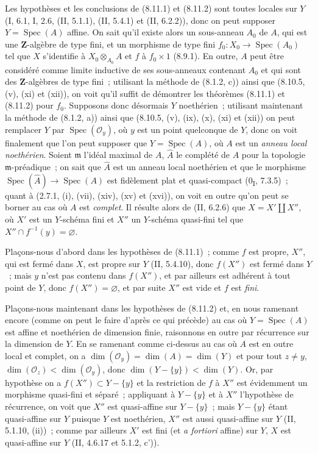 \begin{env}[8.11.4]
\label{IV.8.11.4-fr}
Les hypothèses et les conclusions de (8.11.1) et (8.11.2) sont toutes locales
sur $Y$ (I, 6.1, I, 2.6, (II, 5.1.1), (II, 5.4.1) et (II, 6.2.2)), donc on
peut supposer $Y=\operatorname{Spec}(A)$ affine. On sait qu'il existe alors un
sous-anneau $A_0$ de $A$, qui est une $\mathbf Z$-algèbre de type fini, et un
morphisme de type fini $f_0:X_0\to\operatorname{Spec}(A_0)$ tel que $X$
s'identifie à $X_0\otimes_{A_0}A$ et $f$ à $f_0\times1$ (8.9.1). En outre,
$A$ peut être considéré comme limite inductive de ses sous-anneaux contenant
$A_0$ et qui sont des $\mathbf Z$-algèbres de type fini~; utilisant la méthode
de (8.1.2, c)) ainsi que (8.10.5, (v), (xi) et (xii)), on voit qu'il suffit de
démontrer les théorèmes (8.11.1) et (8.11.2) pour $f_0$. Supposons donc
désormais $Y$ noethérien~; utilisant maintenant la méthode de (8.1.2, a))
ainsi que (8.10.5, (v), (ix), (x), (xi) et (xii)) on peut remplacer $Y$ par
$\operatorname{Spec}(\mathcal O_y)$, où $y$ est un
point quelconque de $Y$, donc on voit finalement que l'on peut supposer que
$Y=\operatorname{Spec}(A)$, où $A$ est un \emph{anneau local noethérien}.
Soient $\mathfrak m$ l'idéal maximal de $A$, $\widehat A$ le complété de $A$
pour la topologie $\mathfrak m$-préadique~; on sait que $\widehat A$ est un
anneau local noethérien et que le morphisme
$\operatorname{Spec}(\widehat A)\to\operatorname{Spec}(A)$ est fidèlement
plat et quasi-compact (0\textsubscript{I}, 7.3.5)~; quant à (2.7.1, (i),
(vii), (xiv), (xv) et (xvi)), on voit en outre qu'on peut se borner au cas où
$A$ est \emph{complet}. Il résulte alors de (II, 6.2.6) que
$X=X'\amalg X''$, où $X'$ est un $Y$-schéma fini et $X''$ un $Y$-schéma
quasi-fini tel que $X''\cap f^{-1}(y)=\varnothing$.
\end{env}

Plaçons-nous d'abord dans les hypothèses de (8.11.1)~; comme $f$ est propre,
$X''$, qui est fermé dans $X$, est propre sur $Y$ (II, 5.4.10), donc
$f(X'')$ est fermé dans $Y$~; mais $y$ n'est pas contenu dans $f(X'')$, et
par ailleurs est adhérent à tout point de $Y$, donc $f(X'')=\varnothing$, et
par suite $X''$ est vide et $f$ est \emph{fini}.

Plaçons-nous maintenant dans les hypothèses de (8.11.2) et, en nous ramenant
encore (comme on peut le faire d'après ce qui précède) au cas où
$Y=\operatorname{Spec}(A)$ est affine et noethérien de dimension finie,
raisonnons en outre par récurrence sur la dimension de $Y$. En se ramenant
comme ci-dessus au cas où $A$ est en outre local et complet, on a
$\dim(\mathcal O_y)=\dim(A)=\dim(Y)$ et pour tout $z\neq y$,
$\dim(\mathcal O_z)<\dim(\mathcal O_y)$, donc
$\dim(Y-\{y\})<\dim(Y)$. Or, par hypothèse on a
$f(X'')\subset Y-\{y\}$ et la restriction de $f$ à $X''$ est évidemment un
morphisme quasi-fini et séparé~; appliquant à $Y-\{y\}$ et à $X''$
l'hypothèse de récurrence, on voit que $X''$ est quasi-affine sur
$Y-\{y\}$~; mais $Y-\{y\}$ étant quasi-affine sur $Y$ puisque $Y$ est
noethérien, $X''$ est aussi quasi-affine sur $Y$ (II, 5.1.10, (ii))~; comme
par ailleurs $X'$ est fini (et \emph{a fortiori} affine) sur $Y$, $X$ est
quasi-affine sur $Y$ (II, 4.6.17 et 5.1.2, c')).

